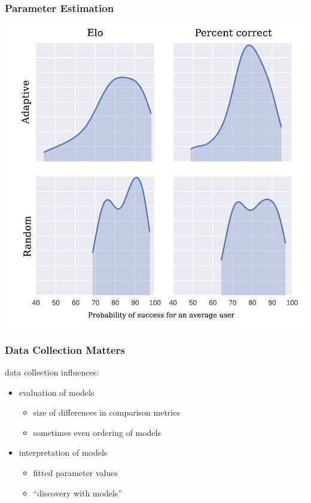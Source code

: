 \documentclass[bigger]{beamer}
\begin{document}
\begin{frame}
  \frametitle{Parameter Estimation}
  \begin{center}
    \includegraphics[width=.6\linewidth]{diffs-hist-europe-split}
  \end{center}
\end{frame}

\begin{frame}
  \frametitle{Data Collection Matters}

  data collection influences:
  \begin{itemize}
  \item evaluation of models
    \begin{itemize}
    \item size of differences in comparison metrics
    \item sometimes even ordering of models
    \end{itemize}
  \item interpretation of models
    \begin{itemize}
    \item fitted parameter values
    \item ``discovery with models''
    \end{itemize}
  \end{itemize}
\end{frame}
\end{document}
